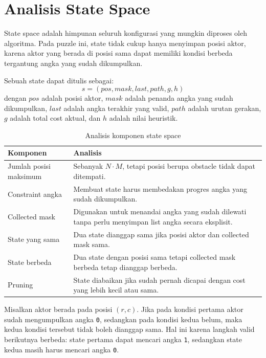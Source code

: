 \section{Analisis State Space}

State space adalah himpunan seluruh konfigurasi yang mungkin diproses oleh algoritma. 
Pada puzzle ini, state tidak cukup hanya menyimpan posisi aktor, karena aktor yang berada di posisi sama dapat memiliki kondisi berbeda tergantung angka yang sudah dikumpulkan.

\begin{tcolorbox}[
	colback=blue!5,
	colframe=blue!60!black,
	title=\textbf{Definisi State Space},
	arc=2mm,
	boxrule=0.8pt
]
Sebuah state dapat ditulis sebagai:
\[
	s = (pos, mask, last, path, g, h)
\]
dengan $pos$ adalah posisi aktor, $mask$ adalah penanda angka yang sudah dikumpulkan, $last$ adalah angka terakhir yang valid, $path$ adalah urutan gerakan, $g$ adalah total cost aktual, dan $h$ adalah nilai heuristik.
\end{tcolorbox}

\begin{table}[H]
	\centering
	\caption{Analisis komponen state space}
	\begin{tabular}{|p{4cm}|p{10cm}|}
		\hline
		\rowcolor{blue!15}
		\textbf{Komponen} & \textbf{Analisis} \\
		\hline
		Jumlah posisi maksimum & Sebanyak $N \cdot M$, tetapi posisi berupa obstacle tidak dapat ditempati. \\
		\hline
		Constraint angka & Membuat state harus membedakan progres angka yang sudah dikumpulkan. \\
		\hline
		Collected mask & Digunakan untuk menandai angka yang sudah dilewati tanpa perlu menyimpan list angka secara eksplisit. \\
		\hline
		State yang sama & Dua state dianggap sama jika posisi aktor dan collected mask sama. \\
		\hline
		State berbeda & Dua state dengan posisi sama tetapi collected mask berbeda tetap dianggap berbeda. \\
		\hline
		Pruning & State diabaikan jika sudah pernah dicapai dengan cost yang lebih kecil atau sama. \\
		\hline
	\end{tabular}
\end{table}

\begin{tcolorbox}[
	colback=gray!5,
	colframe=black!60,
	title=\textbf{Mengapa Posisi Saja Tidak Cukup?},
	arc=2mm,
	boxrule=0.8pt
]
Misalkan aktor berada pada posisi $(r,c)$. 
Jika pada kondisi pertama aktor sudah mengumpulkan angka \texttt{0}, sedangkan pada kondisi kedua belum, maka kedua kondisi tersebut tidak boleh dianggap sama. 
Hal ini karena langkah valid berikutnya berbeda: state pertama dapat mencari angka \texttt{1}, sedangkan state kedua masih harus mencari angka \texttt{0}.
\end{tcolorbox}

